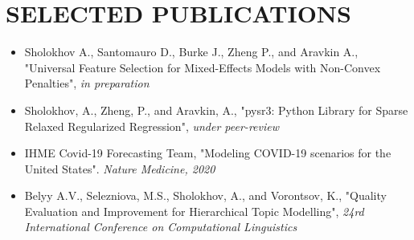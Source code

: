 \documentclass[10pt,letterpaper,roman]{moderncv}        %
\begin{document}
\section{SELECTED PUBLICATIONS}
 
 \begin{itemize}
 		\item Sholokhov A., Santomauro D., Burke J., Zheng P., and Aravkin A., "Universal Feature Selection for Mixed-Effects Models with Non-Convex Penalties", \textit{in preparation}
 		\item Sholokhov, A., Zheng, P., and Aravkin, A., "pysr3: Python Library for Sparse Relaxed Regularized Regression", \textit{under peer-review}
        \item IHME Covid-19 Forecasting Team, "Modeling COVID-19 scenarios for the United States". \textit{Nature Medicine, 2020}
        \item Belyy A.V., Selezniova, M.S., Sholokhov, A., and Vorontsov, K., "Quality Evaluation and Improvement for Hierarchical Topic Modelling",  \textit{24rd International Conference on Computational Linguistics}
    \end{itemize}


%


\end{document}
